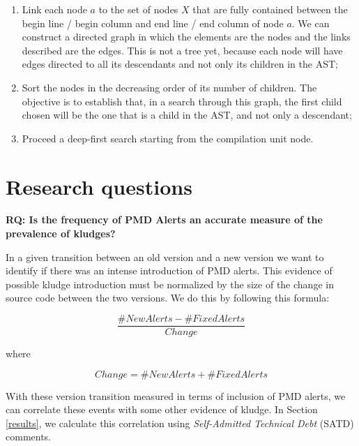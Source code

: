\documentclass[
]{article}
\begin{document}
\begin{enumerate}
\item
  Link each node \(a\) to the set of nodes \(X\) that are fully
  contained between the begin line / begin column and end line / end
  column of node \(a\). We can construct a directed graph in which
  the elements are the nodes and the links described are the edges. This
  is not a tree yet, because each node will have edges directed to all
  its descendants and not only its children in the AST;

\item
  Sort the nodes in the decreasing order of its number of children. The
  objective is to establish that, in a search through this graph, the
  first child chosen will be the one that is a child in the AST, and not
  only a descendant;

\item
  Proceed a deep-first search starting from the compilation unit node.
\end{enumerate}


\section{Research questions}
\label{as_whole}

\noindent
\textbf{RQ: Is the frequency of PMD Alerts an accurate measure of the prevalence of kludges?}
\label{PMD_Kludge}

In a given transition between an old version and a new version we want
to identify if there was an intense introduction of PMD alerts. This
evidence of possible kludge introduction must be normalized by the size
of the change in source code between the two versions. We do this by
following this formula:

\[ \frac{\#NewAlerts - \#FixedAlerts}{Change}    \]

where

\[Change = \#NewAlerts + \#FixedAlerts\]

With these version transition measured in terms of inclusion of PMD
alerts, we can correlate these events with some other evidence of
kludge. In Section \ref{results}, we calculate this correlation using
\textit{Self-Admitted Technical Debt} (SATD) comments.

\vspace{16px}
\end{document}
